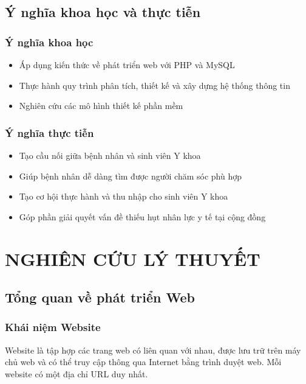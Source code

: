 \documentclass[a4paper,12pt]{report}
\begin{document}
\section{Ý nghĩa khoa học và thực tiễn}

\subsection{Ý nghĩa khoa học}
\begin{itemize}
    \item Áp dụng kiến thức về phát triển web với PHP và MySQL
    \item Thực hành quy trình phân tích, thiết kế và xây dựng hệ thống thông tin
    \item Nghiên cứu các mô hình thiết kế phần mềm
\end{itemize}

\subsection{Ý nghĩa thực tiễn}
\begin{itemize}
    \item Tạo cầu nối giữa bệnh nhân và sinh viên Y khoa
    \item Giúp bệnh nhân dễ dàng tìm được người chăm sóc phù hợp
    \item Tạo cơ hội thực hành và thu nhập cho sinh viên Y khoa
    \item Góp phần giải quyết vấn đề thiếu hụt nhân lực y tế tại cộng đồng
\end{itemize}


\chapter{NGHIÊN CỨU LÝ THUYẾT}

\section{Tổng quan về phát triển Web}

\subsection{Khái niệm Website}
Website là tập hợp các trang web có liên quan với nhau, được lưu trữ trên máy chủ web và có thể truy cập thông qua Internet bằng trình duyệt web. Mỗi website có một địa chỉ URL duy nhất.
\end{document}
